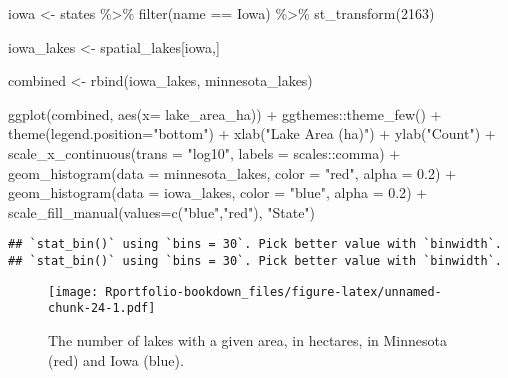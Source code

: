 \documentclass[
]{book}
\newenvironment{Shaded}{\begin{snugshade}}{\end{snugshade}}
\newcommand{\AttributeTok}[1]{\textcolor[rgb]{0.77,0.63,0.00}{#1}}
\newcommand{\DecValTok}[1]{\textcolor[rgb]{0.00,0.00,0.81}{#1}}
\newcommand{\FloatTok}[1]{\textcolor[rgb]{0.00,0.00,0.81}{#1}}
\newcommand{\FunctionTok}[1]{\textcolor[rgb]{0.00,0.00,0.00}{#1}}
\newcommand{\NormalTok}[1]{#1}
\newcommand{\OtherTok}[1]{\textcolor[rgb]{0.56,0.35,0.01}{#1}}
\newcommand{\SpecialCharTok}[1]{\textcolor[rgb]{0.00,0.00,0.00}{#1}}
\newcommand{\StringTok}[1]{\textcolor[rgb]{0.31,0.60,0.02}{#1}}
\begin{document}
\begin{Shaded}
\begin{Highlighting}[]
\NormalTok{iowa }\OtherTok{\textless{}{-}}\NormalTok{ states }\SpecialCharTok{\%\textgreater{}\%}
  \FunctionTok{filter}\NormalTok{(name }\SpecialCharTok{==} \StringTok{\textquotesingle{}Iowa\textquotesingle{}}\NormalTok{) }\SpecialCharTok{\%\textgreater{}\%}
  \FunctionTok{st\_transform}\NormalTok{(}\DecValTok{2163}\NormalTok{)}

\NormalTok{iowa\_lakes }\OtherTok{\textless{}{-}}\NormalTok{ spatial\_lakes[iowa,]}

\NormalTok{combined }\OtherTok{\textless{}{-}} \FunctionTok{rbind}\NormalTok{(iowa\_lakes, minnesota\_lakes)}

\FunctionTok{ggplot}\NormalTok{(combined, }\FunctionTok{aes}\NormalTok{(}\AttributeTok{x=}\NormalTok{ lake\_area\_ha)) }\SpecialCharTok{+} 
\NormalTok{  ggthemes}\SpecialCharTok{::}\FunctionTok{theme\_few}\NormalTok{() }\SpecialCharTok{+} \FunctionTok{theme}\NormalTok{(}\AttributeTok{legend.position=}\StringTok{"bottom"}\NormalTok{) }\SpecialCharTok{+}
  \FunctionTok{xlab}\NormalTok{(}\StringTok{"Lake Area (ha)"}\NormalTok{) }\SpecialCharTok{+} \FunctionTok{ylab}\NormalTok{(}\StringTok{"Count"}\NormalTok{) }\SpecialCharTok{+}
  \FunctionTok{scale\_x\_continuous}\NormalTok{(}\AttributeTok{trans =} \StringTok{"log10"}\NormalTok{, }\AttributeTok{labels =}\NormalTok{ scales}\SpecialCharTok{::}\NormalTok{comma) }\SpecialCharTok{+}
  \FunctionTok{geom\_histogram}\NormalTok{(}\AttributeTok{data =}\NormalTok{ minnesota\_lakes, }\AttributeTok{color =} \StringTok{"red"}\NormalTok{, }\AttributeTok{alpha =} \FloatTok{0.2}\NormalTok{) }\SpecialCharTok{+} 
  \FunctionTok{geom\_histogram}\NormalTok{(}\AttributeTok{data =}\NormalTok{ iowa\_lakes, }\AttributeTok{color =} \StringTok{"blue"}\NormalTok{, }\AttributeTok{alpha =} \FloatTok{0.2}\NormalTok{) }\SpecialCharTok{+}
  \FunctionTok{scale\_fill\_manual}\NormalTok{(}\AttributeTok{values=}\FunctionTok{c}\NormalTok{(}\StringTok{"blue"}\NormalTok{,}\StringTok{"red"}\NormalTok{), }\StringTok{"State"}\NormalTok{)}
\end{Highlighting}
\end{Shaded}

\begin{verbatim}
## `stat_bin()` using `bins = 30`. Pick better value with `binwidth`.
## `stat_bin()` using `bins = 30`. Pick better value with `binwidth`.
\end{verbatim}

\begin{figure}
\centering
\texttt{[image: Rportfolio-bookdown\_files/figure-latex/unnamed-chunk-24-1.pdf]}
\caption{\label{fig:unnamed-chunk-24}The number of lakes with a given area, in hectares, in Minnesota (red) and Iowa (blue).}
\end{figure}
\end{document}
